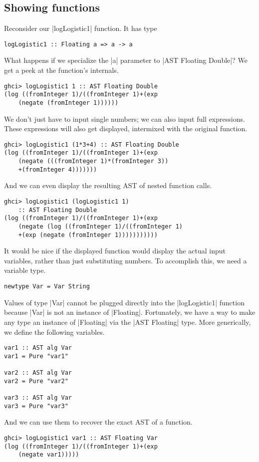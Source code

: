 \documentclass[preprint]{sigplanconf}
\theoremstyle{definition}
\begin{document}
\subsection{Showing functions}
Reconsider our |logLogistic1| function.
It has type
\begin{lstlisting}
logLogistic1 :: Floating a => a -> a
\end{lstlisting}
What happens if we specialize the |a| parameter to |AST Floating Double|?
We get a peek at the function's internals.
\begin{lstlisting}
ghci> logLogistic1 1 :: AST Floating Double
(log ((fromInteger 1)/((fromInteger 1)+(exp
    (negate (fromInteger 1))))))
\end{lstlisting}
We don't just have to input single numbers;
we can also input full expressions.
These expressions will also get displayed,
intermixed with the original function.
\begin{lstlisting}
ghci> logLogistic1 (1*3+4) :: AST Floating Double
(log ((fromInteger 1)/((fromInteger 1)+(exp
    (negate (((fromInteger 1)*(fromInteger 3))
    +(fromInteger 4)))))))
\end{lstlisting}
And we can even display the resulting AST of nested function calls.
\begin{lstlisting}
ghci> logLogistic1 (logLogistic1 1)
    :: AST Floating Double
(log ((fromInteger 1)/((fromInteger 1)+(exp
    (negate (log ((fromInteger 1)/((fromInteger 1)
    +(exp (negate (fromInteger 1)))))))))))
\end{lstlisting}
It would be nice if the displayed function would display the actual input variables,
rather than just substituting numbers.
To accomplish this, we need a variable type.
\begin{lstlisting}
newtype Var = Var String
\end{lstlisting}
Values of type |Var| cannot be plugged directly into the |logLogistic1| function because |Var| is not an instance of |Floating|.
Fortunately, we have a way to make any type an instance of |Floating| via the |AST Floating| type.
More generically, we define the following variables.
\begin{lstlisting}
var1 :: AST alg Var
var1 = Pure "var1"

var2 :: AST alg Var
var2 = Pure "var2"

var3 :: AST alg Var
var3 = Pure "var3"
\end{lstlisting}
And we can use them to recover the exact AST of a function.
\begin{lstlisting}
ghci> logLogistic1 var1 :: AST Floating Var
(log ((fromInteger 1)/((fromInteger 1)+(exp
    (negate var1)))))
\end{lstlisting}
\end{document}
